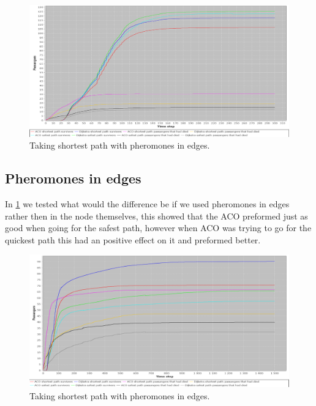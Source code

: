 \begin{figure} [h]
\centering
\hspace*{-1.0in}
\includegraphics[scale=0.35]{images/Graph-using-200-rounds-140-passangers-and-one-hazzard-and-ACO-having-pheremons-in-edges.png}
\caption{Taking shortest path with pheromones in edges.}
\label{fig:celebPherInEdge}
\end{figure}
\subsection{Pheromones in edges}

In \ref{fig:celebPherInEdge} we tested what would the difference be if we used pheromones in edges rather then in the node themselves, this showed that the ACO preformed just as good when going for the safest path, however when ACO was trying to go for the quickest path this had an positive effect on it and preformed better.

\begin{figure} [h]
\centering
\hspace*{-1.0in}
\includegraphics[scale=0.35]{images/Graph-using-200-rounds-140-passangers-and-one-fire-high-panic.png}
\caption{Taking shortest path with pheromones in edges.}
\label{fig:celebHPanic}
\end{figure}

